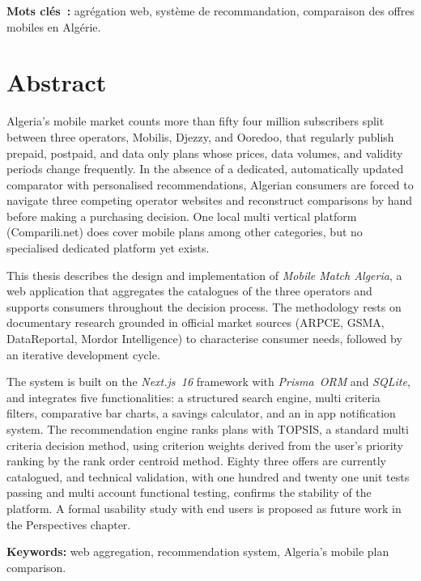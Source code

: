 \bigskip
\noindent\textbf{Mots clés~:} agrégation web, système de recommandation, comparaison des offres mobiles en Algérie.

\newpage

{}
\chapter*{Abstract}

Algeria's mobile market counts more than fifty four million subscribers split between three operators, Mobilis, Djezzy, and Ooredoo, that regularly publish prepaid, postpaid, and data only plans whose prices, data volumes, and validity periods change frequently. In the absence of a dedicated, automatically updated comparator with personalised recommendations, Algerian consumers are forced to navigate three competing operator websites and reconstruct comparisons by hand before making a purchasing decision. One local multi vertical platform (Comparili.net) does cover mobile plans among other categories, but no specialised dedicated platform yet exists.

This thesis describes the design and implementation of \textit{Mobile Match Algeria}, a web application that aggregates the catalogues of the three operators and supports consumers throughout the decision process. The methodology rests on documentary research grounded in official market sources (ARPCE, GSMA, DataReportal, Mordor Intelligence) to characterise consumer needs, followed by an iterative development cycle.

The system is built on the \textit{Next.js~16} framework with \textit{Prisma~ORM} and \textit{SQLite}, and integrates five functionalities: a structured search engine, multi criteria filters, comparative bar charts, a savings calculator, and an in app notification system. The recommendation engine ranks plans with TOPSIS, a standard multi criteria decision method, using criterion weights derived from the user's priority ranking by the rank order centroid method. Eighty three offers are currently catalogued, and technical validation, with one hundred and twenty one unit tests passing and multi account functional testing, confirms the stability of the platform. A formal usability study with end users is proposed as future work in the Perspectives chapter.

\bigskip
\noindent\textbf{Keywords:} web aggregation, recommendation system, Algeria's mobile plan comparison.

